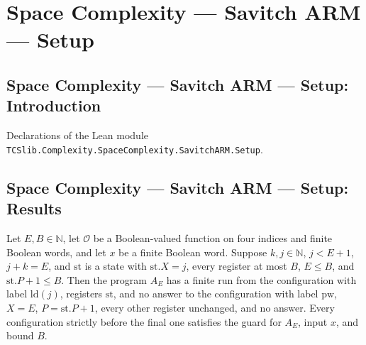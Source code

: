 \section{Space Complexity --- Savitch ARM --- Setup}
\subsection*{Space Complexity --- Savitch ARM --- Setup: Introduction}

Declarations of the Lean module \texttt{TCSlib.Complexity.SpaceComplexity.SavitchARM.Setup}.

\subsection*{Space Complexity --- Savitch ARM --- Setup: Results}

\begin{theorem}
\label{Complexity.LogProg.SavitchARM.ld_run}
\leanok
{}
Let $E,B\in\mathbb{N}$, let $\mathcal{O}$ be a Boolean-valued function on four indices
and finite Boolean words, and let $x$ be a finite Boolean word. Suppose
$k,j\in\mathbb{N}$, $j<E+1$, $j+k=E$, and $\mathrm{st}$ is a state with
$\mathrm{st}.X=j$, every register at most $B$, $E\le B$, and $\mathrm{st}.P+1\le B$.
Then the program $A_E$ has a finite run from the configuration with label
$\mathrm{ld}(j)$, registers $\mathrm{st}$, and no answer to the configuration with label
$\mathrm{pw}$, $X=E$, $P=\mathrm{st}.P+1$, every other register unchanged, and no
answer. Every configuration strictly before the final one satisfies the guard for $A_E$,
input $x$, and bound $B$.
\end{theorem}

